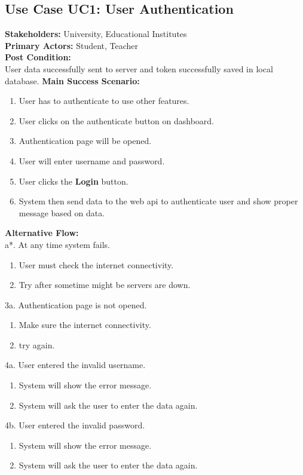 \subsection{Use Case UC1: User Authentication}
\textbf{Stakeholders: } University, Educational Institutes \\
\textbf{Primary Actors: } Student, Teacher \\
\textbf{Post Condition: }\\
User data successfully sent to server and token successfully saved in local database.
\textbf{Main Success Scenario: }
\begin{enumerate}
\item User has to authenticate to use other features.
\item User clicks on the authenticate button on dashboard.
\item Authentication page will be opened.
\item User will enter username and password.
\item User clicks the \textbf{Login} button.
\item System then send data to the web api to authenticate user and show proper message based on data. 
\end{enumerate}
\textbf{Alternative Flow: }\\
a*. At any time system fails.
\begin{enumerate}
\item User must check the internet connectivity.
\item Try after sometime might be servers are down.
\end{enumerate}
3a. Authentication page is not opened.
\begin{enumerate}
\item Make sure the internet connectivity.
\item try again.
\end{enumerate}
4a. User entered the invalid username.
\begin{enumerate}
\item System will show the error message.
\item System will ask the user to enter the data again.
\end{enumerate}
4b. User entered the invalid password.
\begin{enumerate}
\item System will show the error message.
\item System will ask the user to enter the data again.
\end{enumerate}



